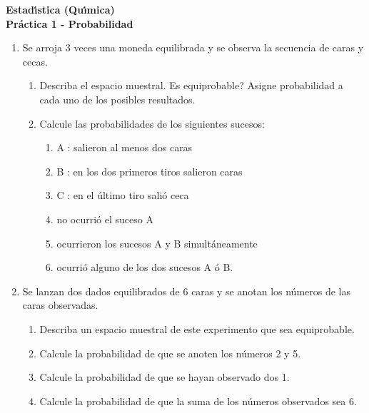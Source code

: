 \documentclass[11pt,a4paper,twoside]{article}%
\begin{document}
\thispagestyle{plain}

\begin{center}
\textbf{\textsf{Estad\'{\i}stica (Qu\'{\i}mica) }}\\
\vspace{0.2cm}
\textbf{Pr\'{a}ctica 1 - Probabilidad\vspace{-0.1in}}
\end{center}

\begin{enumerate}
\item Se arroja 3 veces una moneda equilibrada y se observa la secuencia de
caras y cecas.\vspace{-0.2cm}

\begin{enumerate}
\item Describa el espacio muestral. \textquestiondown Es equiprobable? Asigne probabilidad a cada uno de los  posibles resultados.

\item Calcule las probabilidades de los siguientes sucesos:\vspace{-0.1cm}

\begin{enumerate}
\item A : salieron al menos dos caras

\item B : en los dos primeros tiros salieron caras

\item C : en el \'{u}ltimo tiro sali\'{o} ceca

\item no ocurri\'{o} el suceso A

\item ocurrieron los sucesos A y B simult\'{a}neamente

\item ocurri\'{o} alguno de los dos sucesos A \'{o} B.
\end{enumerate}
\end{enumerate}


\item Se lanzan dos dados equilibrados de 6 caras y se anotan los n\'umeros de las caras observadas.
\begin{enumerate}
\item Describa un espacio muestral de este experimento que sea equiprobable.
\item Calcule la probabilidad de que se anoten los n\'umeros 2 y 5.
\item Calcule la probabilidad de que se hayan observado dos 1.
\item Calcule la probabilidad de que la suma de los n\'umeros observados sea 6.
\end{enumerate}



\end{enumerate}
\end{document}
